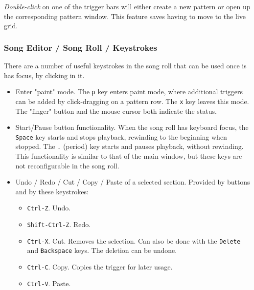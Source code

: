    \textsl{Double-click} on one of the trigger bars
   will either create a new pattern or open up the corresponding pattern
   window.
   This feature saves having to move to the live grid.

\subsubsection{Song Editor / Song Roll / Keystrokes}
\label{subsubsec:song_editor_song_roll_keystrokes}

   There are a number of useful keystrokes in the song roll that can be used
   once is has focus, by clicking in it.

   \begin{itemize}
      \item Enter "paint" mode.
         The \texttt{p} key enters paint mode, where additional triggers
         can be added by click-dragging on a pattern row.
         The \texttt{x} key leaves this mode.
         The "finger" button and the mouse cursor both indicate the status.
      \item Start/Pause button functionality.
         When the song roll has keyboard focus,
         the \texttt{Space} key starts and stops playback, rewinding to the
         beginning when stopped.
         The \texttt{.} (period) key starts and pauses playback, without
         rewinding.
         This functionality is similar to that of the main window, but
         these keys are not reconfigurable in the song roll.
      \item Undo / Redo / Cut / Copy / Paste of a selected section.
         Provided by buttons and by these keystrokes:
         \begin{itemize}
            \item \texttt{Ctrl-Z}. Undo.
            \item \texttt{Shift-Ctrl-Z}. Redo.
            \item \texttt{Ctrl-X}. Cut.  Removes the selection.
            Can also be done with the \texttt{Delete} and
            \texttt{Backspace} keys.
            The deletion can be undone.
            \item \texttt{Ctrl-C}. Copy.
            Copies the trigger for later usage.
            \item \texttt{Ctrl-V}. Paste.

\end{itemize}
\end{itemize}
